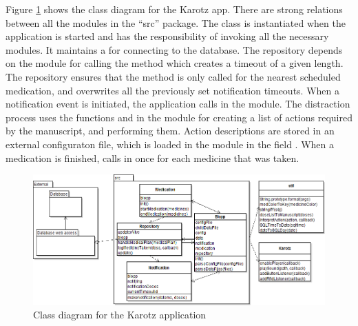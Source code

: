 Figure \ref{fig:class-diagram-karotz} shows the class diagram for the Karotz app. There are strong relations between all the modules in the ``src''
package. The  class is instantiated when the application is started and has the responsibility of invoking all the necessary modules. It maintains a 
for connecting to the database. The repository depends on the  module for calling the method  which creates a timeout of a given
length. The repository ensures that the method is only called for the nearest scheduled medication, and overwrites all the previously set notification timeouts. When
a notification event is initiated, the application calls  in the  module. The distraction process uses the functions  
and  in the module  for creating a list of actions required by the manuscript, and performing them. Action descriptions are stored in an external configuraton
file, which is loaded in the  module in the field . When a medication is finished,  calls  in 
once for each medicine that was taken.

\begin{figure}
	\centering
		\includegraphics[width = \linewidth]{Pictures/ArchPictures/KarotzClassDiagram.png}
	\caption{Class diagram for the Karotz application}
	\label{fig:class-diagram-karotz}
\end{figure}
